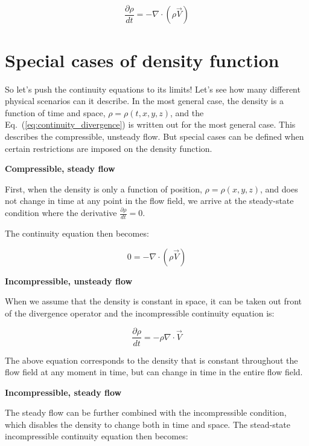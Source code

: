 \begin{equation} \label{eq:continuity_divergence}
\frac{\partial \rho}{dt} = - \nabla \cdot (\rho \vec{V})
\end{equation}

\section{Special cases of density function}

So let's push the continuity equations to its limits! Let's see how many different physical scenarios can it describe.
In the most general case, the density is a function of time and space, $\rho = \rho(t, x, y, z)$, and the Eq.~(\ref{eq:continuity_divergence}) is written out for the most general case. This describes the compressible, unsteady flow. But special cases can be defined when certain restrictions are imposed on the density function.

\textbf{Compressible, steady flow}

First, when the density is only a function of position, $\rho = \rho(x,y,z)$, and does not change in time at any point in the flow field, we arrive at the steady-state condition where the derivative $\frac{\partial \rho}{dt} = 0$.

The continuity equation then becomes:

\begin{equation} \label{eq:continuity_stst}
0 = - \nabla \cdot (\rho  \vec{V})
\end{equation}

\textbf{Incompressible, unsteady flow}

When we assume that the density is constant in space, it can be taken out front of the divergence operator and the incompressible continuity equation is:

\begin{equation} \label{eq:continuity_incompressible}
\frac{\partial \rho}{dt} = - \rho \nabla \cdot \vec{V}
\end{equation}

The above equation corresponds to the density that is constant throughout the flow field at any moment in time, but can change in time in the entire flow field.

\textbf{Incompressible, steady flow}

The steady flow can be further combined with the incompressible condition, which disables the density to change both in time and space. The stead-state incompressible continuity equation then becomes:


